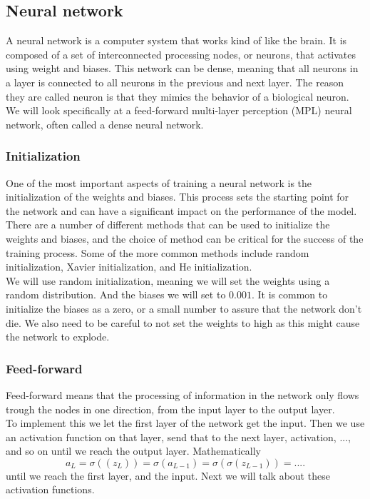 


\subsection{Neural network}
A neural network is a computer system that works kind of like the brain. It is
composed of a set of interconnected processing nodes, or neurons, that
activates using weight and biases. This network can be dense, meaning that all
neurons in a layer is connected to all neurons in the previous and next layer.
The reason they are called neuron is that they mimics the behavior of a
biological neuron. We will look specifically at a feed-forward multi-layer
perception (MPL) neural network, often called a dense neural network. 


\subsubsection{Initialization}

One of the most important aspects of training a neural network is the
initialization of the weights and biases. This process sets the starting point
for the network and can have a significant impact on the performance of the
model. There are a number of different methods that can be used to initialize
the weights and biases, and the choice of method can be critical for the
success of the training process. Some of the more common methods include random
initialization, Xavier initialization, and He initialization.
\\
We will use random initialization, meaning we will set the weights using a
random distribution. And the biases we will set to $0.001$. It is common to
initialize the biases as a zero, or a small number to assure that the network
don't die. We also need to be careful to not set the weights to high as this
might cause the network to explode. 


\subsubsection{Feed-forward}
Feed-forward means that the processing of information in the network only flows
trough the nodes in one direction, from the input layer to the output layer.
\\
To implement this we let the first layer of the network get the input. Then we
use an activation function on that layer, send that to the next layer,
activation, ..., and so on until we reach the output layer. Mathematically
\begin{equation*}
    a_L = \sigma((z_L))=\sigma{(a_{L-1})=\sigma{(\sigma(z_{L-1}))}}=....
\end{equation*}
until we reach the first layer, and the input. Next we will talk about these activation
functions.

